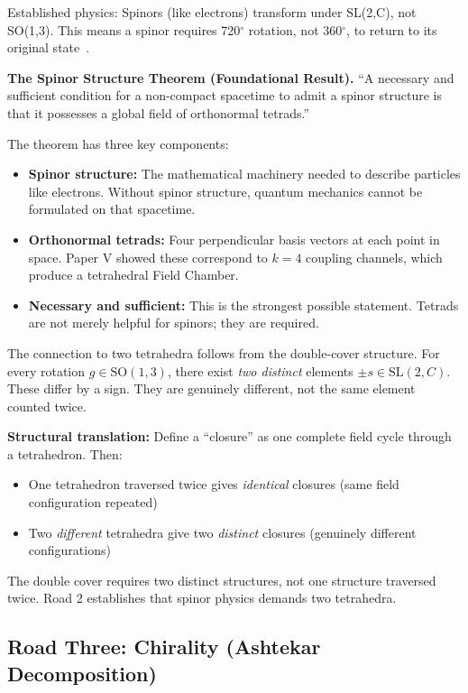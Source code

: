 \documentclass[aps,prd,preprint,superscriptaddress,showpacs,preprintnumbers,amsmath,amssymb,nofootinbib]{revtex4-2}
\begin{document}
Established physics: Spinors (like electrons) transform under SL(2,C), not SO(1,3). This means a spinor requires 720$^\circ$ rotation, not 360$^\circ$, to return to its original state~\cite{weinberg1995,geroch1968}.

\textbf{The Spinor Structure Theorem (Foundational Result).} ``A necessary and sufficient condition for a non-compact spacetime to admit a spinor structure is that it possesses a global field of orthonormal tetrads.''~\cite{geroch1968}

The theorem has three key components:
\begin{itemize}
\item \textbf{Spinor structure:} The mathematical machinery needed to describe particles like electrons. Without spinor structure, quantum mechanics cannot be formulated on that spacetime.
\item \textbf{Orthonormal tetrads:} Four perpendicular basis vectors at each point in space. Paper V showed these correspond to $k=4$ coupling channels, which produce a tetrahedral Field Chamber.
\item \textbf{Necessary and sufficient:} This is the strongest possible statement. Tetrads are not merely helpful for spinors; they are required.
\end{itemize}

The connection to two tetrahedra follows from the double-cover structure. For every rotation $g \in \text{SO}(1,3)$, there exist \emph{two distinct} elements $\pm s \in \text{SL}(2,C)$. These differ by a sign. They are genuinely different, not the same element counted twice.

\textbf{Structural translation:} Define a ``closure'' as one complete field cycle through a tetrahedron. Then:
\begin{itemize}
\item One tetrahedron traversed twice gives \emph{identical} closures (same field configuration repeated)
\item Two \emph{different} tetrahedra give two \emph{distinct} closures (genuinely different configurations)
\end{itemize}

The double cover requires two distinct structures, not one structure traversed twice. Road 2 establishes that spinor physics demands two tetrahedra.

\subsection{Road Three: Chirality (Ashtekar Decomposition)}
\label{subsec:road-chirality}
\end{document}
